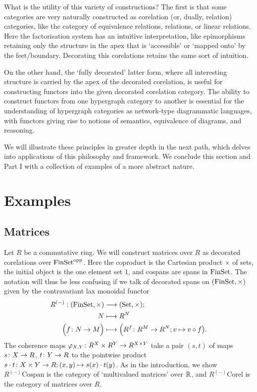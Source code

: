 What is the utility of this variety of constructions? The first is that some
categories are very naturally constructed as corelation (or, dually, relation)
categories, like the category of equivalence relations, relations, or linear
relations. Here the factorisation system has an intuitive interpretation, like
epimorphisms retaining only the structure in the apex that is `accessible' or
`mapped onto' by the feet/boundary. Decorating this corelations retains the same
sort of intuition.

On the other hand, the `fully decorated' latter form, where all interesting
structure is carried by the apex of the decorated corelation, is useful for
constructing functors into the given decorated corelation category. The ability
to construct functors from one hypergraph category to another is essential for
the understanding of hypergraph categories as network-type diagrammatic
languages, with functors giving rise to notions of semantics, equivalence of
diagrams, and reasoning.

We will illustrate these principles in greater depth in the next path, which
delves into applications of this philosophy and framework. We conclude this
section and Part I with a collection of examples of a more abstract nature.



\section{Examples} \label{sec:excor}
\subsection{Matrices}

Let $R$ be a commutative ring. We will construct matrices over $R$ as decorated
corelations over $\mathrm{FinSet}^{\mathrm{opp}}$. Here the coproduct is the Cartesian product
$\times$ of sets, the initial object is the one element set $1$, and cospans are
spans in $\mathrm{FinSet}$. The notation will thus be less confusing if we talk of
decorated spans on $(\mathrm{FinSet},\times)$ given by the contravariant lax monoidal
functor
\begin{align*}
  R^{(-)}: (\mathrm{FinSet},\times) &\longrightarrow (\mathrm{Set},\times); \\
  N &\longmapsto R^N \\
  \Big(f{\colon} N \to M\Big) &\longmapsto \Big(R^f{\colon} R^M \to R^N; v \mapsto v \circ
  f\big).
\end{align*}
The coherence maps $\varphi_{X,Y}{\colon} R^X \times R^Y \to R^{X\times Y}$ take a
pair $(s,t)$ of maps $s{\colon} X \to R$, $t{\colon} Y \to R$ to the pointwise product
$s\cdot t {\colon} X\times Y \to R; (x,y) \mapsto s(x) \cdot t(y)$. As in the
introduction, we show $R^{(-)}\mathrm{Cospan}$ is the category of `multivalued
matrices' over ${\mathbb{R}}$, and $R^{(-)}\mathrm{Corel}$ is the category of matrices
over $R$. 

